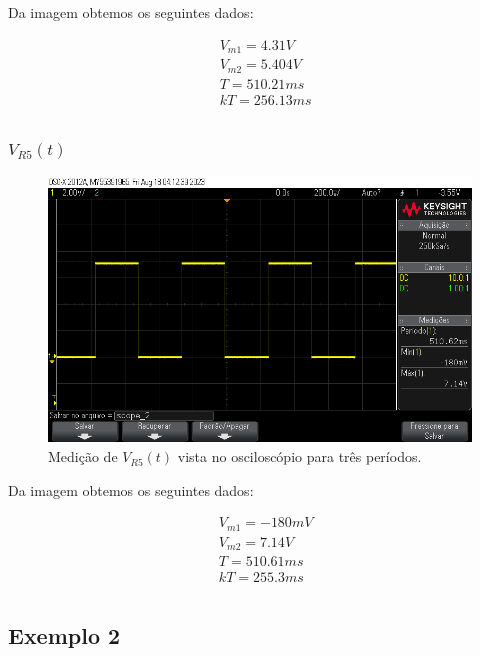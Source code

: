 Da imagem obtemos os seguintes dados:

\begin{equation}
    \begin{aligned}
         & V_{m1} = 4.31V  \\
         & V_{m2} = 5.404V \\
         & T = 510.21ms    \\
         & kT =  256.13ms  \\
    \end{aligned}
\end{equation}

\subsubsection{$V_{R5} (t)$}

\begin{figure}[H]
    \centering
    \includegraphics[width=0.7\columnwidth]{images/ex1_r5.png}
    \caption{Medição de $V_{R5}(t)$ vista no osciloscópio para três períodos.}
\end{figure}

Da imagem obtemos os seguintes dados:

\begin{equation}
    \begin{aligned}
         & V_{m1} = -180mV \\
         & V_{m2} = 7.14V  \\
         & T = 510.61ms    \\
         & kT =  255.3ms   \\
    \end{aligned}
\end{equation}


\subsection{Exemplo 2}

